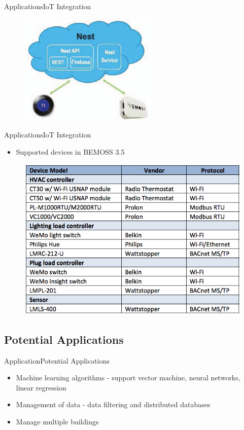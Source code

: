 \documentclass{beamer}
\begin{document}
\begin{frame}{Applications}{IoT Integration}
	\begin{figure}
		\includegraphics[scale=0.7]{../figs/nestAndBEMOSS.jpg}
	\end{figure}

\end{frame}

\begin{frame}{Applications}{IoT Integration}
	\begin{itemize}
		\item Supported devices in BEMOSS 3.5
	\end{itemize}
	\begin{figure}
		\includegraphics[scale=0.4]{../figs/bemoss35SupportedHardware.png}
	\end{figure}
\end{frame}

\subsection{Potential Applications}
\begin{frame}{Application}{Potential Applications}
	\begin{itemize}
		\item Machine learning algorithms - support vector machine, neural networks, linear regression
		\item Management of data - data filtering and distributed databases
		\item Manage multiple buildings
	\end{itemize}
\end{frame}
\end{document}
